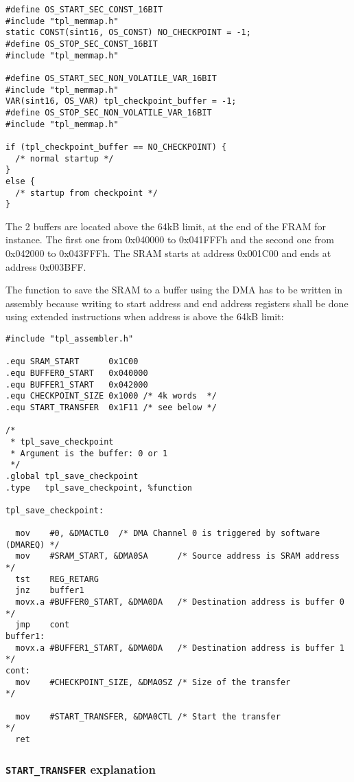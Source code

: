 \documentclass[11pt, oneside]{article}   	%
\begin{document}
\begin{lstlisting}
#define OS_START_SEC_CONST_16BIT
#include "tpl_memmap.h"
static CONST(sint16, OS_CONST) NO_CHECKPOINT = -1;
#define OS_STOP_SEC_CONST_16BIT
#include "tpl_memmap.h"

#define OS_START_SEC_NON_VOLATILE_VAR_16BIT
#include "tpl_memmap.h"
VAR(sint16, OS_VAR) tpl_checkpoint_buffer = -1;
#define OS_STOP_SEC_NON_VOLATILE_VAR_16BIT
#include "tpl_memmap.h"

if (tpl_checkpoint_buffer == NO_CHECKPOINT) {
  /* normal startup */
}
else {
  /* startup from checkpoint */
}
\end{lstlisting}

The 2 buffers are located above the 64kB limit, at the end of the FRAM for instance. The first one from 0x040000 to 0x041FFFh and the second one from 0x042000 to 0x043FFFh.
The SRAM starts at address 0x001C00 and ends at address 0x003BFF.

The function to save the SRAM to a buffer using the DMA has to be written in assembly because writing to start address and end address registers shall be done using extended instructions when address is above the 64kB limit:

\begin{lstlisting}
#include "tpl_assembler.h"

.equ SRAM_START      0x1C00
.equ BUFFER0_START   0x040000
.equ BUFFER1_START   0x042000
.equ CHECKPOINT_SIZE 0x1000 /* 4k words  */
.equ START_TRANSFER  0x1F11 /* see below */

/*
 * tpl_save_checkpoint
 * Argument is the buffer: 0 or 1
 */
.global tpl_save_checkpoint
.type   tpl_save_checkpoint, %function

tpl_save_checkpoint:

  mov    #0, &DMACTL0  /* DMA Channel 0 is triggered by software (DMAREQ) */
  mov    #SRAM_START, &DMA0SA      /* Source address is SRAM address      */
  tst    REG_RETARG
  jnz    buffer1
  movx.a #BUFFER0_START, &DMA0DA   /* Destination address is buffer 0     */
  jmp    cont
buffer1:
  movx.a #BUFFER1_START, &DMA0DA   /* Destination address is buffer 1     */
cont:
  mov    #CHECKPOINT_SIZE, &DMA0SZ /* Size of the transfer                */
  
  mov    #START_TRANSFER, &DMA0CTL /* Start the transfer                  */
  ret
\end{lstlisting}

\subsubsection*{\lstinline{START_TRANSFER} explanation}
\end{document}
